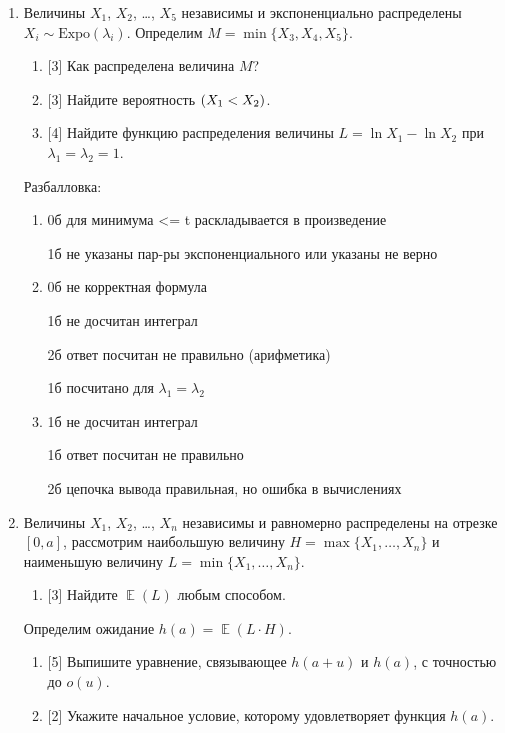 \documentclass[12pt]{article}
\let\P\relax
\DeclareMathOperator{\P}{\mathbb{P}}
\DeclareMathOperator{\E}{\mathbb{E}}
\newcommand{\dExpo}{\mathrm{Expo}}
\begin{document}
\begin{enumerate}
    \item Величины $X_1$, $X_2$, \dots, $X_5$ независимы и экспоненциально распределены $X_i \sim \dExpo(\lambda_i)$.
    Определим  $M = \min\{X_3, X_4, X_5\}$.
    \begin{enumerate}
        \item {[3]} Как распределена величина $M$?
        \item {[3]} Найдите вероятность $\P(X_1 < X_2)$.
        \item {[4]} Найдите функцию распределения величины $L = \ln X_1 - \ln X_2$ при $\lambda_1 = \lambda_2 = 1$.
    \end{enumerate}


    Разбалловка:

    \begin{enumerate}
        \item 0б для минимума <= t раскладывается в произведение
        
        1б не указаны пар-ры экспоненциального или указаны не верно
        \item  0б не корректная формула
        
        1б не досчитан интеграл
        
        2б ответ посчитан не правильно (арифметика)
        
        1б посчитано для $\lambda_1 = \lambda_2$
        
        \item  1б не досчитан интеграл
        
        1б ответ посчитан не правильно
        
        2б цепочка вывода правильная, но ошибка в вычислениях
    \end{enumerate}


    \item Величины $X_1$, $X_2$, \dots, $X_n$ независимы и равномерно распределены на отрезке $[0, a]$,
    рассмотрим наибольшую величину $H = \max\{X_1, \dots, X_n\}$ и наименьшую величину $L = \min\{X_1, \dots, X_n\}$.
    \begin{enumerate}
        \item {[3]} Найдите $\E(L)$ любым способом. 
    \end{enumerate}
    Определим ожидание $h(a) = \E(L \cdot H)$.
    \begin{enumerate}[resume]
        \item {[5]} Выпишите уравнение, связывающее $h(a + u)$ и $h(a)$, с точностью до $o(u)$.
        \item {[2]} Укажите начальное условие, которому удовлетворяет функция $h(a)$.
    \end{enumerate}


\end{enumerate}
\end{document}
